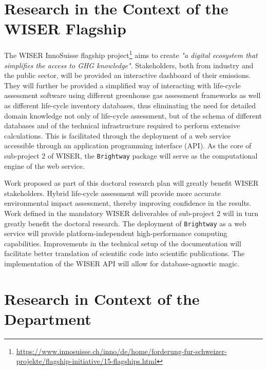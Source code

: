 \documentclass{article}
\begin{document}
\section{Research in the Context of the WISER Flagship}
    
    The WISER InnoSuisse flagship project\footnote{\url{https://www.innosuisse.ch/inno/de/home/forderung-fur-schweizer-projekte/flagship-initiative/15-flagships.html}} aims to create \textit{"a digital ecosystem that simplifies the access to GHG knowledge"}. Stakeholders, both from industry and the public sector, will be provided an interactive dashboard of their emissions. They will further be provided a simplified way of interacting with life-cycle assessment software using different greenhouse gas assessment frameworks as well as different life-cycle inventory databases, thus eliminating the need for detailed domain knowledge not only of life-cycle assessment, but of the schema of different databases and of the technical infrastructure required to perform extensive calculations. This is facilitated through the deployment of a web service accessible through an application programming interface (API). As the core of sub-project 2 of WISER, the \texttt{Brightway} package will serve as the computational engine of the web service.
    
    Work proposed as part of this doctoral research plan will greatly benefit WISER stakeholders. Hybrid life-cycle assessment will provide more accurate environmental impact assessment, thereby improving confidence in the results. Work defined in the mandatory WISER deliverables of sub-project 2 will in turn greatly benefit the doctoral research. The deployment of \texttt{Brightway} as a web service will provide platform-independent high-performance computing capabilities. Improvements in the technical setup of the documentation will facilitate better translation of scientific code into scientific publications. The implementation of the WISER API will allow for database-agnostic magic.
    
\section{Research in Context of the Department}
\end{document}

